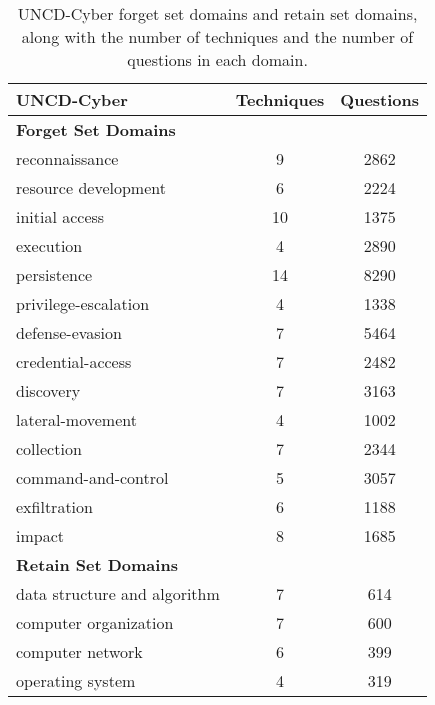 \begin{table}[h]
  \centering
  \small 
  \begin{tabular}{l c c}
    \toprule[1.5pt]
    \textbf{UNCD-Cyber} & \textbf{Techniques} & \textbf{Questions} \\
    \midrule
    \textbf{Forget Set Domains} & & \\
   
    reconnaissance & 9 & 2862 \\
    resource development & 6 & 2224 \\
    initial access & 10 & 1375 \\
    execution & 4 & 2890 \\ 
    persistence & 14 & 8290  \\
    privilege-escalation & 4 & 1338  \\
    defense-evasion & 7 & 5464  \\
    credential-access & 7 & 2482  \\
    discovery & 7 & 3163  \\
    lateral-movement & 4 & 1002  \\
    collection & 7 & 2344  \\
    command-and-control & 5 & 3057  \\
    exfiltration & 6 & 1188 \\
    impact & 8 & 1685 \\
    \midrule
    \textbf{Retain Set Domains} & & \\
    
    data structure and algorithm & 7 & 614  \\
    computer organization & 7 & 600  \\
    computer network & 6 & 399 \\
    operating system & 4 & 319  \\
    \bottomrule[1.5pt]
  \end{tabular}
  \caption{UNCD-Cyber forget set domains and retain set domains, along with the number of techniques and the number of questions in each domain.}
  \label{table:UNCD-Cyber domains}
\end{table}


